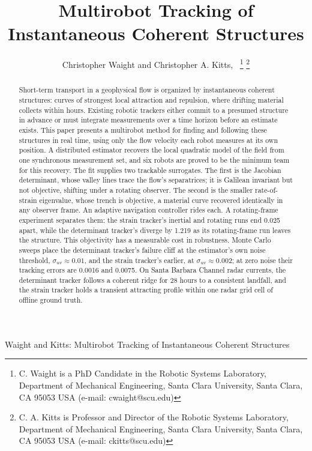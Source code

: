 \documentclass[lettersize,journal]{IEEEtran}
\begin{document}
\title{Multirobot Tracking of
Instantaneous Coherent Structures}

\author{Christopher Waight and Christopher A. Kitts,~
\thanks{C. Waight is a PhD Candidate in the Robotic Systems Laboratory, Department of Mechanical Engineering, Santa Clara University, Santa Clara, CA 95053 USA (e-mail: cwaight@scu.edu)}
\thanks{C. A. Kitts is Professor and Director of the Robotic Systems Laboratory, Department of Mechanical Engineering, Santa Clara University, Santa Clara, CA 95053 USA (e-mail: ckitts@scu.edu)}
}
%
{Waight and Kitts: Multirobot Tracking of Instantaneous Coherent Structures}

\maketitle

\begin{abstract}
Short-term transport in a geophysical flow is organized by
instantaneous coherent structures: curves of strongest local attraction
and repulsion, where drifting material collects within hours. Existing
robotic trackers either commit to a presumed structure in advance or
must integrate measurements over a time horizon before an estimate
exists. This paper presents a multirobot method for finding and
following these structures in real time, using only the flow velocity
each robot measures at its own position. A distributed estimator
recovers the local quadratic model of the field from one synchronous
measurement set, and six robots are proved to be the minimum team for
this recovery. The fit supplies two trackable surrogates. The first is the Jacobian
determinant, whose valley lines trace the flow's separatrices; it is
Galilean invariant but not objective, shifting under a rotating observer.
The second is the smaller rate-of-strain eigenvalue, whose trench is
objective, a material curve recovered identically in any observer frame.
An adaptive navigation controller rides each. A rotating-frame experiment
separates them: the strain tracker's inertial and rotating runs end
0.025 apart, while the determinant tracker's diverge by 1.219 as its
rotating-frame run leaves the structure. This objectivity has a
measurable cost in robustness. Monte Carlo sweeps place the determinant
tracker's failure cliff at the estimator's own noise threshold,
$\sigma_{uv} \approx 0.01$, and the strain tracker's earlier, at
$\sigma_{uv} \approx 0.002$; at zero noise their tracking errors are
0.0016 and 0.0075. On Santa Barbara Channel radar currents, the
determinant tracker follows a coherent ridge for 28 hours to a consistent
landfall, and the strain tracker holds a transient attracting profile
within one radar grid cell of offline ground truth.
\end{abstract}
\end{document}
